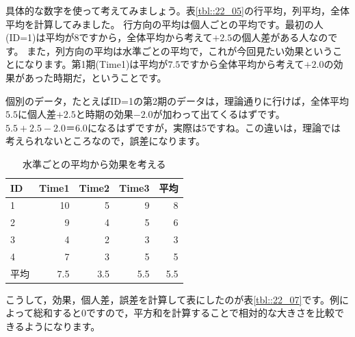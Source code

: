 \documentclass{ltjbook}
\begin{document}
具体的な数字を使って考えてみましょう。表\ref{tbl::22_05}の行平均，列平均，全体平均を計算してみました。
行方向の平均は個人ごとの平均です。最初の人(ID=1)は平均が$8$ですから，全体平均から考えて$+2.5$の個人差がある人なのです。
また，列方向の平均は水準ごとの平均で，これが今回見たい効果ということになります。第1期(Time1)は平均が$7.5$ですから全体平均から考えて$+2.0$の効果があった時期だ，ということです。

個別のデータ，たとえばID=1の第2期のデータは，理論通りに行けば，全体平均$5.5$に個人差$+2.5$と時期の効果$-2.0$が加わって出てくるはずです。$5.5+2.5-2.0＝6.0$になるはずですが，実際は$5$ですね。この違いは，理論では考えられないところなので，誤差になります。
\begin{table}[ht]
	\centering
	\caption{水準ごとの平均から効果を考える}
	\begin{tabular}{lrrr|r}
		\hline
		ID & Time1 & Time2 & Time3 & 平均  \\
		\hline
		1  & 10    & 5     & 9     & 8   \\
		2  & 9     & 4     & 5     & 6   \\
		3  & 4     & 2     & 3     & 3   \\
		4  & 7     & 3     & 5     & 5   \\
		\hline
		平均 & 7.5   & 3.5   & 5.5   & 5.5 \\\hline
	\end{tabular}
	\label{tbl::22_06}
\end{table}
こうして，効果，個人差，誤差を計算して表にしたのが表\ref{tbl::22_07}です。例によって総和すると0ですので，平方和を計算することで相対的な大きさを比較できるようになります。
\end{document}
